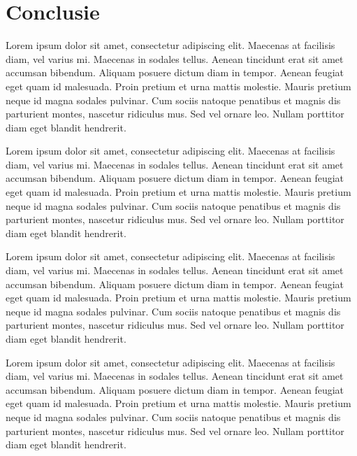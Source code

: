 \chapter{Conclusie}

Lorem ipsum dolor sit amet, consectetur adipiscing elit. Maecenas at facilisis diam, vel varius mi. Maecenas in sodales tellus. Aenean tincidunt erat sit amet accumsan bibendum. Aliquam posuere dictum diam in tempor. Aenean feugiat eget quam id malesuada. Proin pretium et urna mattis molestie. Mauris pretium neque id magna sodales pulvinar. Cum sociis natoque penatibus et magnis dis parturient montes, nascetur ridiculus mus. Sed vel ornare leo. Nullam porttitor diam eget blandit hendrerit.

Lorem ipsum dolor sit amet, consectetur adipiscing elit. Maecenas at facilisis diam, vel varius mi. Maecenas in sodales tellus. Aenean tincidunt erat sit amet accumsan bibendum. Aliquam posuere dictum diam in tempor. Aenean feugiat eget quam id malesuada. Proin pretium et urna mattis molestie. Mauris pretium neque id magna sodales pulvinar. Cum sociis natoque penatibus et magnis dis parturient montes, nascetur ridiculus mus. Sed vel ornare leo. Nullam porttitor diam eget blandit hendrerit.

Lorem ipsum dolor sit amet, consectetur adipiscing elit. Maecenas at facilisis diam, vel varius mi. Maecenas in sodales tellus. Aenean tincidunt erat sit amet accumsan bibendum. Aliquam posuere dictum diam in tempor. Aenean feugiat eget quam id malesuada. Proin pretium et urna mattis molestie. Mauris pretium neque id magna sodales pulvinar. Cum sociis natoque penatibus et magnis dis parturient montes, nascetur ridiculus mus. Sed vel ornare leo. Nullam porttitor diam eget blandit hendrerit.

Lorem ipsum dolor sit amet, consectetur adipiscing elit. Maecenas at facilisis diam, vel varius mi. Maecenas in sodales tellus. Aenean tincidunt erat sit amet accumsan bibendum. Aliquam posuere dictum diam in tempor. Aenean feugiat eget quam id malesuada. Proin pretium et urna mattis molestie. Mauris pretium neque id magna sodales pulvinar. Cum sociis natoque penatibus et magnis dis parturient montes, nascetur ridiculus mus. Sed vel ornare leo. Nullam porttitor diam eget blandit hendrerit.
